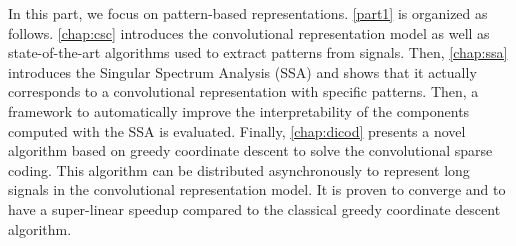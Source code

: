 \documentclass[../thesis.tex]{subfiles}
\begin{document}
	In this part, we focus on pattern-based representations. \autoref{part1}
	is organized as follows. \autoref{chap:csc} introduces the convolutional representation
	model as well as state-of-the-art algorithms used to extract patterns from signals. Then,
	\autoref{chap:ssa} introduces the Singular Spectrum Analysis (SSA) and shows that it
	actually corresponds to a convolutional representation with specific patterns. Then, a
	framework to automatically improve the interpretability of the components computed with
	the SSA is evaluated. Finally, \autoref{chap:dicod} presents a novel algorithm based on
	greedy coordinate descent to solve the convolutional sparse coding. This algorithm can
	be distributed asynchronously to represent long signals in the convolutional representation
	model. It is proven to converge and to have a super-linear speedup compared to the
	classical greedy coordinate descent algorithm.

\biblio{}
\end{document}
